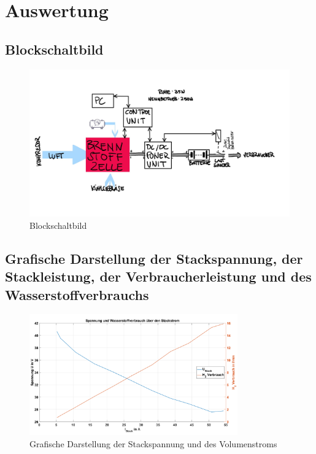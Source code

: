 \section{Auswertung}
\label{sec:Auswertung}


\subsection{Blockschaltbild}

\begin{figure}[H]
    \centering
    \includegraphics[width=\textwidth]{Abbildungen/Brennstoffzelle_Blockschaltbild.jpeg}
    \caption{Blockschaltbild}
    \label{fig:230628_Blockschaltbild}
\end{figure}


\subsection{Grafische Darstellung der Stackspannung, der Stackleistung, der Verbraucherleistung und des Wasserstoffverbrauchs}

\begin{figure}[H]
    \centering
    \includegraphics[width=0.8\textwidth]{Abbildungen/Aufgabe62_U und Vdot.png}
    \caption{Grafische Darstellung der Stackspannung und des Volumenstroms}
    \label{fig:230626_Stackspannung_Vdot}
\end{figure}

